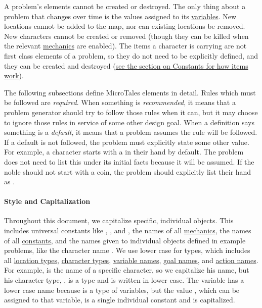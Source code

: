 \documentclass{nilreport}
\begin{document}
A problem's elements cannot be created or destroyed. The only thing about a problem that changes over time is the values assigned to its \hyperref[sec:variables]{variables}. New locations cannot be added to the map, nor can existing locations be removed. New characters cannot be created or removed (though they can be killed when the relevant \hyperref[sec:mechanics]{mechanics} are enabled). The items a character is carrying are not first class elements of a problem, so they do not need to be explicitly defined, and they can be created and destroyed (\hyperref[sec:constants]{see the section on Constants for how items work}).

The following subsections define MicroTales elements in detail. Rules which must be followed are {\em required}. When something is {\em recommended}, it means that a problem generator should try to follow those rules when it can, but it may choose to ignore those rules in service of some other design goal. When a definition says something is a {\em default}, it means that a problem assumes the rule will be followed. If a default is not followed, the problem must explicitly state some other value. For example, a  character starts with a  in their  hand by default. The problem does not need to list this under its initial facts because it will be assumed. If the noble should not start with a coin, the problem should explicitly list their  hand as \None.

\paragraph{Style and Capitalization}
Throughout this document, we capitalize specific, individual objects. This includes universal constants like , , and \None, the names of all \hyperref[sec:mechanics]{mechanics}, the names of all \hyperref[sec:constants]{constants}, and the names given to individual objects defined in example problems, like the character name . We use lower case for types, which includes all \hyperref[sec:locations]{location types}, \hyperref[sec:characters]{character types}, \hyperref[sec:variables]{variable names}, \hyperref[sec:goals]{goal names}, and \hyperref[sec:actions]{action names}. For example,  is the name of a specific character, so we capitalize his name, but his character type, , is a type and is written in lower case. The variable  has a lower case name because  is a type of variables, but the value , which can be assigned to that variable, is a single individual constant and is capitalized.
\end{document}
